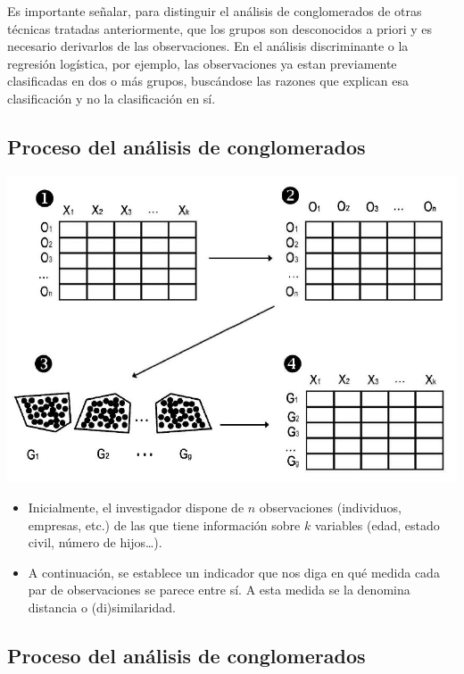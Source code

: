 \documentclass[]{article}
\begin{document}
Es importante señalar, para distinguir el análisis de conglomerados de
otras técnicas tratadas anteriormente, que los grupos son desconocidos a
priori y es necesario derivarlos de las observaciones. En el análisis
discriminante o la regresión logística, por ejemplo, las observaciones
ya estan previamente clasificadas en dos o más grupos, buscándose las
razones que explican esa clasificación y no la clasificación en sí.

\subsection{Proceso del análisis de
conglomerados}\label{proceso-del-anuxe1lisis-de-conglomerados}

\hypertarget{left}{}
\includegraphics[width=1\linewidth]{images/proc_congl}

\hypertarget{right}{}
\begin{itemize}
\item
  Inicialmente, el investigador dispone de \(n\) observaciones
  (individuos, empresas, etc.) de las que tiene información sobre \(k\)
  variables (edad, estado civil, número de hijos\ldots{}).
\item
  A continuación, se establece un indicador que nos diga en qué medida
  cada par de observaciones se parece entre sí. A esta medida se la
  denomina distancia o (di)similaridad.
\end{itemize}

\subsection{Proceso del análisis de
conglomerados}\label{proceso-del-anuxe1lisis-de-conglomerados-1}
\end{document}

